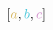 \documentclass[preview]{standalone}
\begin{document}
$\left[\textcolor[HTML]{d7b760}{a}, \textcolor[HTML]{46c6d9}{b}, \textcolor[HTML]{d290cd}{c}\right]$
\end{document}
